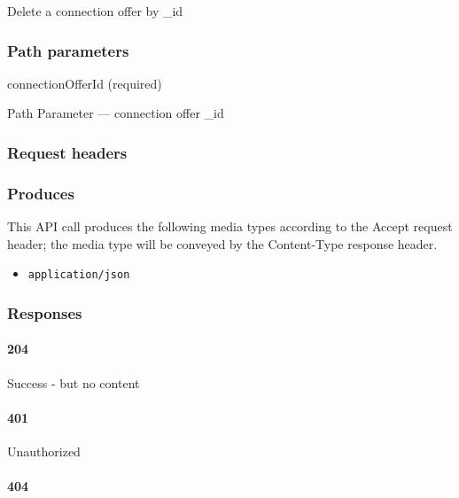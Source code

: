 Delete a connection offer by \_id

\hypertarget{path-parameters-12}{%
\subsubsection{Path parameters}\label{path-parameters-12}}

connectionOfferId (required)

{Path Parameter} --- connection offer \_id

\hypertarget{request-headers-6}{%
\subsubsection{Request headers}\label{request-headers-6}}

\hypertarget{produces-19}{%
\subsubsection{Produces}\label{produces-19}}

This API call produces the following media types according to the
{Accept} request header; the media type will be conveyed by the
{Content-Type} response header.

\begin{itemize}
\tightlist
\item
  \texttt{application/json}
\end{itemize}

\hypertarget{responses-19}{%
\subsubsection{Responses}\label{responses-19}}

\hypertarget{section-63}{%
\paragraph{204}\label{section-63}}

Success - but no content \protect\hyperlink{}{}

\hypertarget{section-64}{%
\paragraph{401}\label{section-64}}

Unauthorized \protect\hyperlink{}{}

\hypertarget{section-65}{%
\paragraph{404}\label{section-65}}

